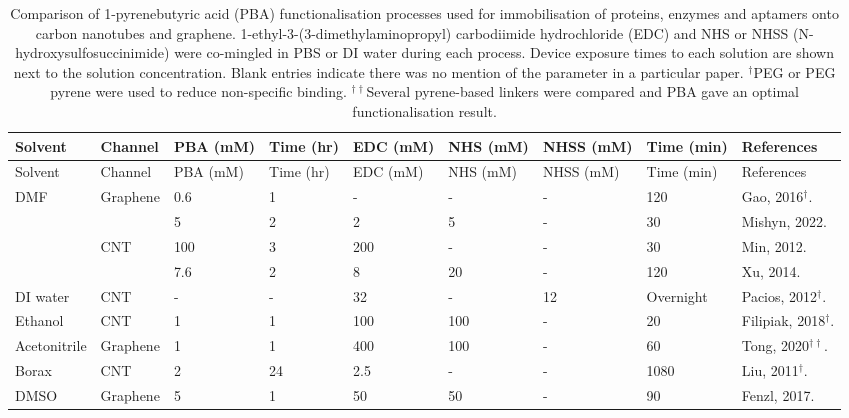 \documentclass[
  a4paper,
]{scrbook}
\begin{document}
\begin{landscape}
\begin{center}

\hypertarget{tbl-pba-functionalisation}{}
\begin{longtable}[]{@{}lllllllll@{}}
\caption{\label{tbl-pba-functionalisation}Comparison of 1-pyrenebutyric
acid (PBA) functionalisation processes used for immobilisation of
proteins, enzymes and aptamers onto carbon nanotubes and graphene.
1-ethyl-3-(3-dimethylaminopropyl) carbodiimide hydrochloride (EDC) and
NHS or NHSS (N-hydroxysulfosuccinimide) were co-mingled in PBS or DI
water during each process. Device exposure times to each solution are
shown next to the solution concentration. Blank entries indicate there
was no mention of the parameter in a particular paper. \(^†\)PEG or PEG
pyrene were used to reduce non-specific binding. \(^{††}\)Several
pyrene-based linkers were compared and PBA gave an optimal
functionalisation result.}\tabularnewline
\toprule\noalign{}
Solvent & Channel & PBA (mM) & Time (hr) & EDC (mM) & NHS (mM) & NHSS
(mM) & Time (min) & References \\
\midrule\noalign{}
\endfirsthead
\toprule\noalign{}
Solvent & Channel & PBA (mM) & Time (hr) & EDC (mM) & NHS (mM) & NHSS
(mM) & Time (min) & References \\
\midrule\noalign{}
\endhead
\bottomrule\noalign{}
\endlastfoot
DMF & Graphene & 0.6 & 1 & - & - & - & 120 & Gao, 2016\(^†\).
\cite{Gao2016} \\
& & 5 & 2 & 2 & 5 & - & 30 & Mishyn, 2022. \cite{Mishyn2022} \\
& CNT & 100 & 3 & 200 & - & - & 30 & Min, 2012. \cite{Min2012} \\
& & 7.6 & 2 & 8 & 20 & - & 120 & Xu, 2014. \cite{Xu2014} \\
DI water & CNT & - & - & 32 & - & 12 & Overnight & Pacios, 2012\(^†\).
\cite{Pacios2012} \\
Ethanol & CNT & 1 & 1 & 100 & 100 & - & 20 & Filipiak, 2018\(^†\).
\cite{Filipiak2018} \\
Acetonitrile & Graphene & 1 & 1 & 400 & 100 & - & 60 & Tong,
2020\(^{††}\). \cite{Tong2020} \\
Borax & CNT & 2 & 24 & 2.5 & - & - & 1080 & Liu, 2011\(^†\).
\cite{Liu2011} \\
DMSO & Graphene & 5 & 1 & 50 & 50 & - & 90 & Fenzl, 2017.
\cite{Fenzl2017} \\
\end{longtable}

\end{center}
\end{landscape}
\restoregeometry %
\end{document}
